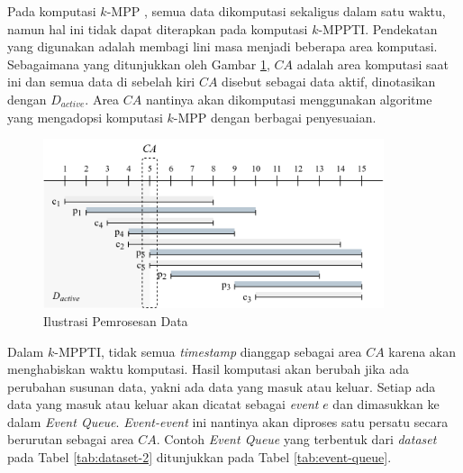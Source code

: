 Pada komputasi $k$-MPP \cite{kmpp}, semua data dikomputasi sekaligus dalam satu waktu, namun hal ini tidak dapat diterapkan pada komputasi $k$-MPPTI. Pendekatan yang digunakan adalah membagi lini masa menjadi beberapa area komputasi. Sebagaimana yang ditunjukkan oleh Gambar \ref{fig:timeline-color}, $CA$ adalah area komputasi saat ini dan semua data di sebelah kiri $CA$ disebut sebagai data aktif, dinotasikan dengan $D_{active}$. Area $CA$ nantinya akan dikomputasi menggunakan algoritme yang mengadopsi komputasi $k$-MPP \cite{kmpp} dengan berbagai penyesuaian.
 
\begin{figure}[H]
	\centering
	\includegraphics[width=10cm]{assets/img/bab3/timeline-color.png}
	\caption{Ilustrasi Pemrosesan Data}
	\label{fig:timeline-color}
\end{figure}

Dalam $k$-MPPTI, tidak semua \textit{timestamp} dianggap sebagai area $CA$ karena akan menghabiskan waktu komputasi. Hasil komputasi akan berubah jika ada perubahan susunan data, yakni ada data yang masuk atau keluar. Setiap ada data yang masuk atau keluar akan dicatat sebagai \textit{event} $e$ dan dimasukkan ke dalam \textit{Event Queue}. \textit{Event-event} ini nantinya akan diproses satu persatu secara berurutan sebagai area $CA$. Contoh \textit{Event Queue} yang terbentuk dari \textit{dataset} pada Tabel \ref{tab:dataset-2} ditunjukkan pada Tabel \ref{tab:event-queue}.

